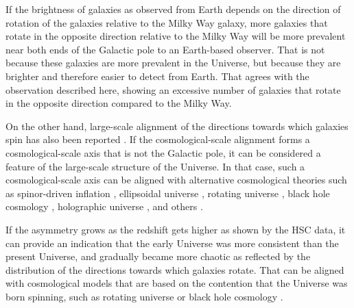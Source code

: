 \documentclass[final,5p,times,twocolumn]{article}
\begin{document}
If the brightness of galaxies as observed from Earth depends on the direction of rotation of the galaxies relative to the Milky Way galaxy, more galaxies that rotate in the opposite direction relative to the Milky Way will be more prevalent near both ends of the Galactic pole to an Earth-based observer. That is not because these galaxies are more prevalent in the Universe, but because they are brighter and therefore easier to detect from Earth. That agrees with the observation described here, showing an excessive number of galaxies that rotate in the opposite direction compared to the Milky Way.

On the other hand, large-scale alignment of the directions towards which galaxies spin has also been reported \citep{jones2010fossil,tempel2013evidence,tempel2013galaxy,codis2015spin,pahwa2016alignment,ganeshaiah2018cosmic,ganeshaiah2019cosmic,blue2020chiles,welker2020sami,kraljic2021sdss,lopez2021deviations}. If the cosmological-scale alignment forms a cosmological-scale axis that is not the Galactic pole, it can be considered a feature of the large-scale structure of the Universe. In that case, such a cosmological-scale axis can be aligned with alternative cosmological theories such as spinor-driven inflation \citep{bohmer2008cmb}, ellipsoidal universe \citep{campanelli2006ellipsoidal,campanelli2007cosmic,campanelli2011cosmic,gruppuso2007complete,cea2014ellipsoidal,tedesco2024ellipsoidal}, rotating universe \citep{godel1949example,ozsvath1962finite,ozsvath2001approaches,sivaram2012primordial,chechin2016rotation,seshavatharam2020integrated,camp2021}, black hole cosmology \citep{pathria1972universe,stuckey1994observable,easson2001universe,seshavatharam2010physics,poplawski2010radial,tatum2018flat,christillin2014machian,chakrabarty2020toy,poplawski2010cosmology,seshavatharam2014understanding,seshavatharam2020integrated,camp2021}, holographic universe \citep{susskind1995world,bak2000holographic,bousso2002holographic,myung2005holographic,hu2006interacting,rinaldi2022matrix,sivaram2013holography,shor2021representation}, and others \citep{astronomy3030014,ashmore2024data}.

If the asymmetry grows as the redshift gets higher as shown by the HSC data, it can provide an indication that the early Universe was more consistent than the present Universe, and gradually became more chaotic as reflected by the distribution of the directions towards which galaxies rotate. That can be aligned with cosmological models that are based on the contention that the Universe was born spinning, such as rotating universe \citep{godel1949example,ozsvath1962finite,ozsvath2001approaches,sivaram2012primordial,chechin2016rotation,seshavatharam2020integrated,camp2021} or black hole cosmology \citep{pathria1972universe,stuckey1994observable,easson2001universe,seshavatharam2010physics,poplawski2010radial,tatum2018flat,christillin2014machian,chakrabarty2020toy,poplawski2010cosmology,seshavatharam2014understanding,seshavatharam2020integrated,camp2021}.
\end{document}
